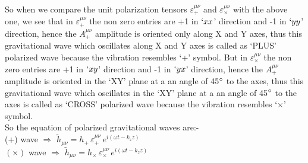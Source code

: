 So when we compare the unit polarization tensors $\varepsilon^{\mu\nu}_{+}$ and $\varepsilon^{\mu\nu}_{\times}$ with the above one, we see that in $\varepsilon^{\mu\nu}_{+}$ the non zero entries are +1 in $`xx$' direction and -1 in $`yy$' direction, hence the $A^{\mu\nu}_{+}$ amplitude is oriented only along X and Y axes, thus this gravitational wave which oscillates along X and Y axes is called as `PLUS' polarized wave because the vibration resembles `+' symbol. But in $\varepsilon^{\mu\nu}_{\times}$ the non zero entries are +1 in $`xy$' direction and -1 in $`yx$' direction, hence the $A^{\mu\nu}_{+}$ amplitude is oriented in the `XY' plane at a an angle of 45$\degree$ to the axes, thus this gravitational wave which oscillates in the `XY' plane at a an angle of 45$\degree$ to the axes is called as `CROSS' polarized wave because the vibration resembles `$\times$' symbol. 
\\

So the equation of polarized gravitational waves are:-\\
(+) wave $\Rightarrow $  $\tilde{h}_{\mu\nu} = h_{+}\, \varepsilon^{\mu\nu}_{+}\, e^{i(\omega t - k_{z}z)}$\\
$(\times)$ wave $\Rightarrow $  $\tilde{h}_{\mu\nu} = h_{\times}\, \varepsilon^{\mu\nu}_{\times}\, e^{i(\omega t - k_{z}z)}$
